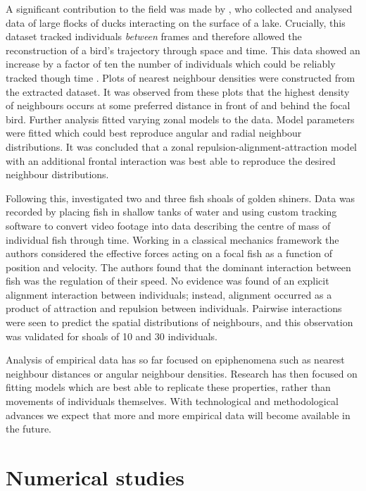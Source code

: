 A significant contribution to the field was made by \textcite{lukeman10}, who
collected and analysed data of large flocks of ducks interacting on the surface
of a lake. Crucially, this dataset tracked individuals \emph{between} frames
and therefore allowed the reconstruction of a bird's trajectory through space
and time. This data showed an increase by a factor of ten the number of
individuals which could be reliably tracked though time \parencite{lukeman09}.
Plots of nearest neighbour densities were constructed from the extracted
dataset. It was observed from these plots that the highest density of
neighbours occurs at some preferred distance in front of and behind the focal
bird. Further analysis fitted varying zonal models to the data. Model
parameters were fitted which could best reproduce angular and radial neighbour
distributions. It was concluded that a zonal repulsion-alignment-attraction
model with an additional frontal interaction was best able to reproduce the
desired neighbour distributions.

Following this, \cite{katz11} investigated two and three fish shoals of golden
shiners. Data was recorded by placing fish in shallow tanks of water and using
custom tracking software to convert video footage into data describing the
centre of mass of individual fish through time. Working in a classical
mechanics framework the authors considered the effective forces acting on a
focal fish as a function of position and velocity. The authors found that the
dominant interaction between fish was the regulation of their speed. No
evidence was found of an explicit alignment interaction between individuals;
instead, alignment occurred as a product of attraction and repulsion between
individuals. Pairwise interactions were seen to predict the spatial
distributions of neighbours, and this observation was validated for shoals of
10 and 30 individuals.

Analysis of empirical data has so far focused on epiphenomena such as nearest
neighbour distances or angular neighbour densities. Research has then focused
on fitting models which are best able to replicate these properties, rather
than movements of individuals themselves. With technological and methodological
advances we expect that more and more empirical data will become available in
the future.

\section{Numerical studies}
\label{sec:numerical_studies}

